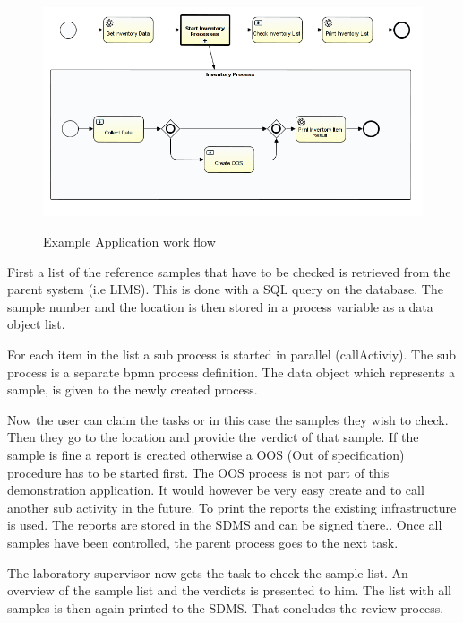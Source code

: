\documentclass[paper=a4,twoside=false,BCOR=0mm,DIV=calc,fontsize=12pt]{scrartcl}
\begin{document}
\begin{figure}
    \begin{center}
      \includegraphics[width=1\textwidth]{./img/PanExampleBPMN.png}\\
    \end{center}
  \caption{Example Application work flow}
  \label{panexampleWorkflow}
\end{figure} 

First a list of the reference samples that have to be checked is retrieved from the parent system (i.e LIMS). This is done with a SQL query on the database. 
The sample number and the location is then stored in a process variable as a data object list.

For each item in the list a sub process is started in parallel (callActiviy). The sub process is a separate bpmn process definition.
The data object which represents a sample, is given to the newly created process.

Now the user can claim the tasks or in this case the samples they wish to check. Then they go to the location and provide the verdict of that sample. If the sample is fine a report is created otherwise a OOS (Out of specification) procedure has to be started first. The OOS process is not part of this demonstration application. It would however be very easy create and to call another sub activity in the future.
To print the reports the existing infrastructure is used. The reports are stored in the SDMS and can be signed there..
Once all samples have been controlled, the parent process goes to the next task.

The laboratory supervisor now gets the task to check the sample list. An overview of the sample list and the verdicts is presented to him.
The list with all samples is then again printed to the SDMS. That concludes the review process.
\end{document}
